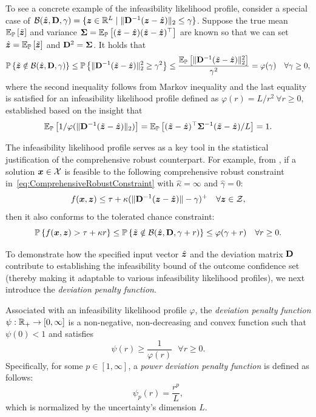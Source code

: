 \documentclass[opre, nonblindrev]{informswp}
\newcommand{\1}[1]{\mathds{1}{\left(#1\right)}}
\begin{document}
To see a concrete example of the infeasibility likelihood profile, consider a special case of $\mathcal{B}(\hat{\bm{z}}, {\mathbf{D}}, \gamma) = \{ \bm z \in \mathbb{R}^L \;|\; \| {\mathbf{D}}^{-1} (\bm z - \hat{\bm{z}}) \|_2 \leq \gamma \}$. Suppose the true mean $\mathbb{E}_{\mathbb{P}}\left[\tilde{\bm{z}}\right]$ and variance $\bm \Sigma = \mathbb{E}_{\mathbb{P}}\left[(\tilde{\bm{z}} - \hat{\bm{z}})(\tilde{\bm{z}} - \hat{\bm{z}})^\top\right]$ are known so that we can set $\hat{\bm{z}} = \mathbb{E}_{\mathbb{P}}\left[\tilde{\bm{z}}\right]$ and ${\mathbf{D}}^2 = {\mathbf{\Sigma}}$. It holds that
$$
\mathbb{P}\left\{\tilde{\bm{z}} \notin \mathcal{B}(\hat{\bm{z}}, {\mathbf{D}}, \gamma)\right\} \leq  \mathbb{P}\left\{\|{\mathbf{D}}^{-1} (\tilde{\bm{z}} - \hat{\bm{z}})\|^2_2 \geq \gamma^2\right\} \leq \frac{\mathbb{E}_{\mathbb{P}}\left[\|{\mathbf{D}}^{-1} (\tilde{\bm{z}} - \hat{\bm{z}})\|^2_2\right]}{\gamma^2} = \varphi(\gamma) ~~~\forall \gamma \geq 0,
$$
where the second inequality follows from Markov inequality and the last equality is satisfied for an infeasibility likelihood profile defined as $\varphi(r) = L/r^2 ~\forall r\geq 0$, established based on the insight that 
$$
\mathbb{E}_{\mathbb{P}}\left[1/ \varphi(\|{\mathbf{D}}^{-1}(\tilde{\bm{z}} - \hat{\bm{z}})\|_2) \right] = \mathbb{E}_{\mathbb{P}}\left[(\tilde{\bm{z}} - \hat{\bm{z}})^\top \bm \Sigma^{-1}(\tilde{\bm{z}} - \hat{\bm{z}})/L\right] = 1.
$$

The infeasibility likelihood profile serves as a key tool in the statistical justification of the comprehensive robust counterpart. For example, from , if a solution $\bm x \in \mathcal{X}$ is feasible to the following comprehensive robust constraint in~\eqref{eq:ComprehensiveRobustConstraint} with $\hat \kappa = \infty$ and $\hat \gamma = 0$:
$$
f(\bm x,\bm z) \leq \tau + \kappa  (\|{\mathbf{D}}^{-1} (\bm{z} - \hat{\bm{z}})\| -\gamma)^+ ~~~\forall \bm z \in \mathcal{Z},
$$
then it also conforms to the tolerated chance constraint:
$$
\mathbb{P}\left\{f(\bm x,\bm z) > \tau + \kappa r\right\} \leq \mathbb{P}\left\{\tilde{\bm{z}} \notin \mathcal{B}(\hat{\bm{z}},{\mathbf{D}}, \gamma + r)\right\} \leq \varphi(\gamma + r) \quad \forall r \geq 0.
$$

To demonstrate how the specified input vector $\hat{\bm{z}}$ and the deviation matrix ${\mathbf{D}}$ contribute to establishing the infeasibility bound of the outcome confidence set (thereby making it adaptable to various infeasibility likelihood profiles), we next introduce the \textit{deviation penalty function}. 

\begin{definition}
\textnormal{
Associated with an infeasibility likelihood profile $\varphi$, the \textit{deviation penalty function} $ \psi:\mathbb{R}_+ \rightarrow [0,\infty]$ is a non-negative, non-decreasing and convex function such that $\psi(0)<1$ and satisfies
$$
\psi(r) \geq \frac{1}{\varphi(r)} ~~~\forall r \geq 0.
$$
Specifically, for some $p \in [1,\infty]$, a \textit{power deviation penalty function} is defined as follows:
$$
\psi_p(r) = \frac{r^p}{L},
$$
which is normalized by the uncertainty's dimension $L$.
}
\end{definition}
\end{document}
